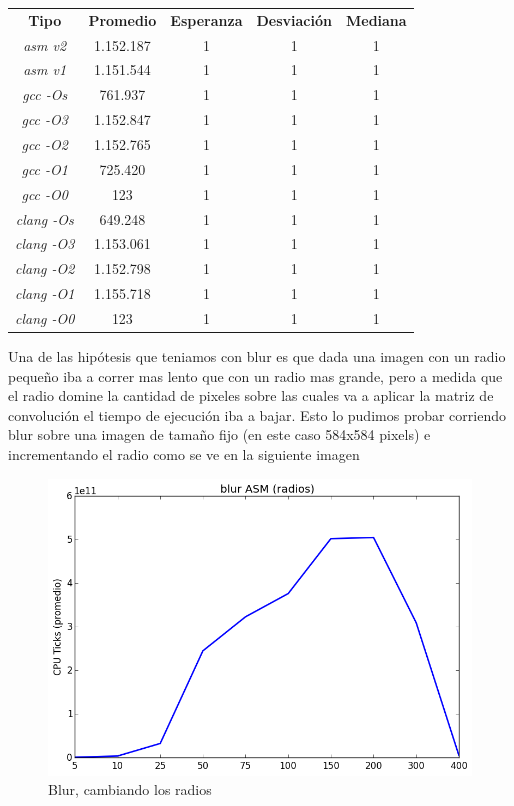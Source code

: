 \documentclass[a4paper]{article}
\begin{document}
\begin{center}
        \begin{tabular}[c]{|c|c|c|c|c|}
    \hline
        \textbf{Tipo} & \textbf{Promedio} & \textbf{Esperanza} & \textbf{Desviación} & \textbf{Mediana}\\
\textit{asm v2} &	1.152.187 & 1 & 1 & 1\\
		\hline
\textit{asm v1} &	1.151.544   & 1 & 1 & 1 \\
		\hline
\textit{gcc -Os} &	761.937 & 1 & 1 & 1 \\
		\hline
\textit{gcc -O3} &	1.152.847 & 1 & 1 & 1 \\
		\hline
\textit{gcc -O2} &	1.152.765 & 1 & 1 & 1 \\
		\hline
\textit{gcc -O1} &	725.420 & 1 & 1 & 1 \\
		\hline
\textit{gcc -O0} & 123  & 1 & 1 & 1 \\
		\hline
\textit{clang -Os} &	649.248 & 1 & 1 & 1 \\
		\hline
\textit{clang -O3} &	1.153.061 & 1 & 1 & 1 \\
		\hline
\textit{clang -O2} &	1.152.798 & 1 & 1 & 1 \\
		\hline
\textit{clang -O1} &	1.155.718 & 1 & 1 & 1 \\
		\hline
\textit{clang -O0} & 123 & 1 & 1 & 1 \\
		\hline
	\end{tabular}
\end{center}

 Una de las hipótesis que teniamos con blur es que dada una imagen con un radio pequeño iba a correr mas lento que con un radio mas grande, pero a medida que el radio domine la cantidad de pixeles sobre las cuales va a aplicar la matriz de convolución el tiempo de ejecución iba a bajar. Esto lo pudimos probar corriendo blur sobre una imagen de tamaño fijo (en este caso 584x584 pixels) e incrementando el radio como se ve en la siguiente imagen


\begin{figure}[h]
	\centerline{\includegraphics[scale=0.62]{imagenes/test_radio_size_ASM.png}}
	\caption{Blur, cambiando los radios}
\end{figure}
\end{document}
